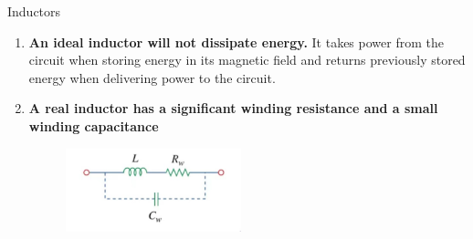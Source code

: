 \documentclass{beamer}
\begin{document}
    \begin{frame}{Inductors}
    \begin{enumerate}
        \item \textbf{An ideal inductor will not dissipate energy.} It takes power from the circuit when storing energy in its magnetic field and returns previously stored energy when delivering power to the circuit.
        \item \textbf{A real inductor has a significant winding resistance and a small winding capacitance} 
        \begin{figure}
        \centering
        \includegraphics[width=2in]{ycy/Chap6/f5.jpg}
        \end{figure}
    
    \end{enumerate}
    \end{frame}
    
\end{document}
